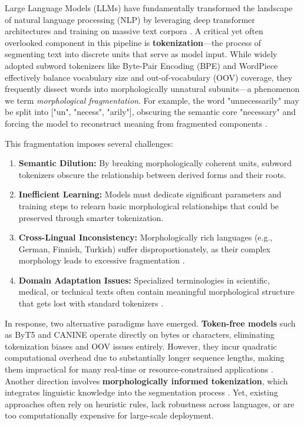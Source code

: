 \documentclass[conference]{IEEEtran}
\begin{document}
Large Language Models (LLMs) have fundamentally transformed the landscape of natural language processing (NLP) by leveraging deep transformer architectures and training on massive text corpora \cite{vaswani2023attention, brown2020language}. A critical yet often overlooked component in this pipeline is \textbf{tokenization}—the process of segmenting text into discrete units that serve as model input. While widely adopted subword tokenizers like Byte-Pair Encoding (BPE) \cite{sennrich2016neural} and WordPiece \cite{schuster2012japanese} effectively balance vocabulary size and out-of-vocabulary (OOV) coverage, they frequently dissect words into morphologically unnatural subunits—a phenomenon we term \textit{morphological fragmentation}. For example, the word "unnecessarily" may be split into ["un", "necess", "arily"], obscuring the semantic core "necessary" and forcing the model to reconstruct meaning from fragmented components \cite{bostrom2021byte, hanafiah2023charm}.

This fragmentation imposes several challenges:
\begin{enumerate}
    \item \textbf{Semantic Dilution:} By breaking morphologically coherent units, subword tokenizers obscure the relationship between derived forms and their roots.
    \item \textbf{Inefficient Learning:} Models must dedicate significant parameters and training steps to relearn basic morphological relationships that could be preserved through smarter tokenization.
    \item \textbf{Cross-Lingual Inconsistency:} Morphologically rich languages (e.g., German, Finnish, Turkish) suffer disproportionately, as their complex morphology leads to excessive fragmentation \cite{ahuja2024tokenization, kann2020multilingual}.
    \item \textbf{Domain Adaptation Issues:} Specialized terminologies in scientific, medical, or technical texts often contain meaningful morphological structure that gets lost with standard tokenizers \cite{zhang2025dynamic, pan2023contextual}.
\end{enumerate}

In response, two alternative paradigms have emerged. \textbf{Token-free models} such as ByT5 \cite{xue2022byt5} and CANINE \cite{clark2021canine} operate directly on bytes or characters, eliminating tokenization biases and OOV issues entirely. However, they incur quadratic computational overhead due to substantially longer sequence lengths, making them impractical for many real-time or resource-constrained applications \cite{tay2022charformer}. Another direction involves \textbf{morphologically informed tokenization}, which integrates linguistic knowledge into the segmentation process \cite{park2022morphology, provilkov2020bpe}. Yet, existing approaches often rely on heuristic rules, lack robustness across languages, or are too computationally expensive for large-scale deployment.
\end{document}
